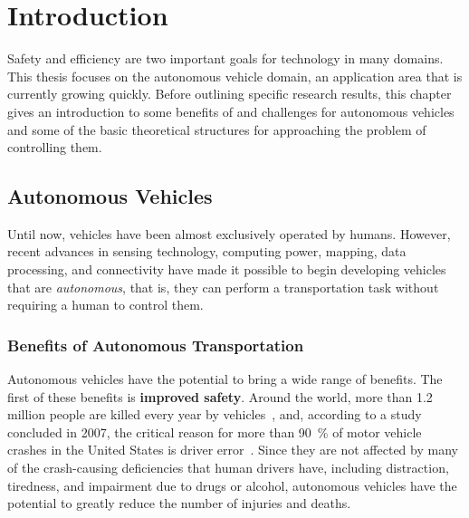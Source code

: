 \chapter{Introduction}

Safety and efficiency are two important goals for technology in many domains.
This thesis focuses on the autonomous vehicle domain, an application area that is currently growing quickly.
Before outlining specific research results, this chapter gives an introduction to some benefits of and challenges for autonomous vehicles and some of the basic theoretical structures for approaching the problem of controlling them.

\section{Autonomous Vehicles}

Until now, vehicles have been almost exclusively operated by humans.
However, recent advances in sensing technology, computing power, mapping, data processing, and connectivity have made it possible to begin developing vehicles that are \emph{autonomous}, that is, they can perform a transportation task without requiring a human to control them.

\subsection{Benefits of Autonomous Transportation} \label{sec:benefits}

Autonomous vehicles have the potential to bring a wide range of benefits.
The first of these benefits is \textbf{improved safety}.
Around the world, more than 1.2 million people are killed every year by vehicles~\cite{who2015global}, and, according to a study concluded in 2007, the critical reason for more than \SI{90}{\percent} of motor vehicle crashes in the United States is driver error~\cite{nhtsa2015critical}.
Since they are not affected by many of the crash-causing deficiencies that human drivers have, including distraction, tiredness, and impairment due to drugs or alcohol, autonomous vehicles have the potential to greatly reduce the number of injuries and deaths.

